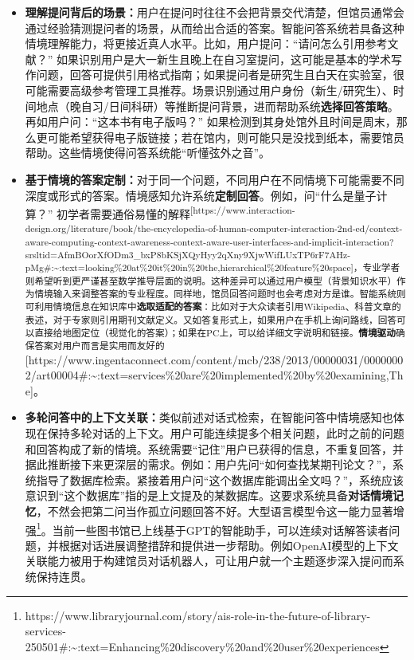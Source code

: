 \documentclass[
  letterpaper,
]{scrbook}
\begin{document}
\begin{itemize}
\item
  \textbf{理解提问背后的场景：}用户在提问时往往不会把背景交代清楚，但馆员通常会通过经验猜测提问者的场景，从而给出合适的答案。智能问答系统若具备这种情境理解能力，将更接近真人水平。比如，用户提问：``请问怎么引用参考文献？''
  如果识别用户是大一新生且晚上在自习室提问，这可能是基本的学术写作问题，回答可提供引用格式指南；如果提问者是研究生且白天在实验室，很可能需要高级参考管理工具推荐。场景识别通过用户身份（新生/研究生）、时间地点（晚自习/日间科研）等推断提问背景，进而帮助系统\textbf{选择回答策略}。再如用户问：``这本书有电子版吗？''
  如果检测到其身处馆外且时间是周末，那么更可能希望获得电子版链接；若在馆内，则可能只是没找到纸本，需要馆员帮助。这些情境使得问答系统能``听懂弦外之音''。
\item
  \textbf{基于情境的答案定制：}对于同一个问题，不同用户在不同情境下可能需要不同深度或形式的答案。情境感知允许系统\textbf{定制回答}。例如，问``什么是量子计算？''
  初学者需要通俗易懂的解释\textsuperscript{{[}https://www.interaction-design.org/literature/book/the-encyclopedia-of-human-computer-interaction-2nd-ed/context-aware-computing-context-awareness-context-aware-user-interfaces-and-implicit-interaction?srsltid=AfmBOorXfODm3\_bxP8bKSjXQyHyy2qXny9XjwWifLUxTP6rF7AHz-pMg\#:\textasciitilde:text=looking\%20at\%20it\%20in\%20the,hierarchical\%20feature\%20space{]}，专业学者则希望听到更严谨甚至数学推导层面的说明。这种差异可以通过用户模型（背景知识水平）作为情境输入来调整答案的专业程度。同样地，馆员回答问题时也会考虑对方是谁。智能系统则可利用情境信息在知识库中\textbf{选取适配的答案}：比如对于大众读者引用Wikipedia、科普文章的表述，对于专家则引用期刊文献定义。又如答复形式上，如果用户在手机上询问路线，回答可以直接给地图定位（视觉化的答案）；如果在PC上，可以给详细文字说明和链接。\textbf{情境驱动}确保答案对用户而言是实用而友好的}{[}https://www.ingentaconnect.com/content/mcb/238/2013/00000031/00000002/art00004\#:\textasciitilde:text=services\%20are\%20implemented\%20by\%20examining,The{]}。
\item
  \textbf{多轮问答中的上下文关联：}类似前述对话式检索，在智能问答中情境感知也体现在保持多轮对话的上下文。用户可能连续提多个相关问题，此时之前的问题和回答构成了新的情境。系统需要``记住''用户已获得的信息，不重复回答，并据此推断接下来更深层的需求。例如：用户先问``如何查找某期刊论文？''，系统指导了数据库检索。紧接着用户问``这个数据库能调出全文吗？''，系统应该意识到``这个数据库''指的是上文提及的某数据库。这要求系统具备\textbf{对话情境记忆}，不然会把第二问当作孤立问题回答不好。大型语言模型令这一能力显著增强\footnote{https://www.libraryjournal.com/story/ais-role-in-the-future-of-library-services-250501\#:\textasciitilde:text=Enhancing\%20discovery\%20and\%20user\%20experiences}。当前一些图书馆已上线基于GPT的智能助手，可以连续对话解答读者问题，并根据对话进展调整措辞和提供进一步帮助。例如OpenAI模型的上下文关联能力被用于构建馆员对话机器人，可让用户就一个主题逐步深入提问而系统保持连贯。

\end{itemize}
\end{document}
